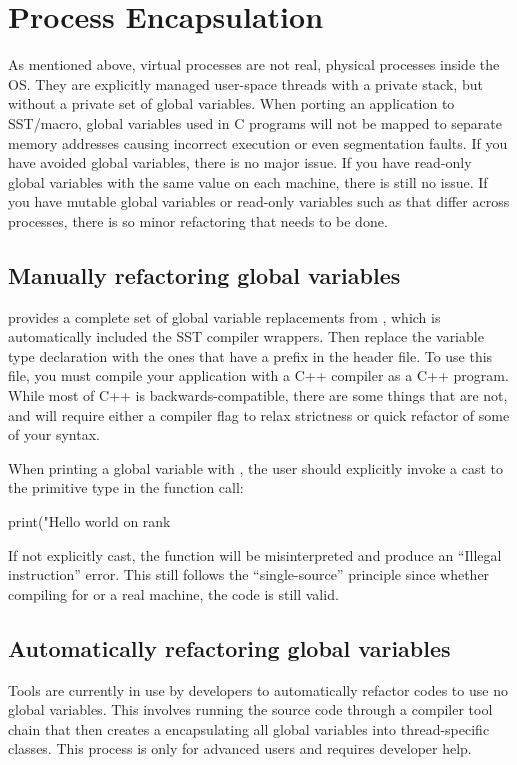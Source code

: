 \section{Process Encapsulation}

As mentioned above, virtual processes are not real, physical processes inside the OS.
They are explicitly managed user-space threads with a private stack, but without a private set of global variables.
When porting an application to SST/macro, global variables used in C programs will not be mapped to separate memory addresses causing incorrect execution or even segmentation faults.
If you have avoided global variables, there is no major issue.  
If you have read-only global variables with the same value on each machine, there is still no issue.
If you have mutable global variables or read-only variables such as  that differ across processes,
there is so minor refactoring that needs to be done.

\subsection{Manually refactoring global variables}
\label{sec:skel:globals}
\sstmacro provides a complete set of global variable replacements from 
, which is automatically included the SST compiler wrappers.
Then replace the variable type declaration with the ones that have a  prefix in the header file.
To use this file, you must compile your application with a C++ compiler as a C++ program.  While most of C++ is backwards-compatible, there are some things that are not, and will require either a compiler flag to relax strictness or quick refactor of some of your syntax.

When printing a global variable with , the user should explicitly invoke a cast to the primitive type in the function call:

\begin{CppCode}
print("Hello world on rank %
\end{CppCode}
If not explicitly cast, the  function will be misinterpreted and produce an ``Illegal instruction'' error.  
This still follows the ``single-source'' principle since whether compiling for \sstmacro or a real machine, the code is still valid.

\subsection{Automatically refactoring global variables}
Tools are currently in use by developers to automatically refactor codes to use no global variables.
This involves running the source code through a compiler tool chain that then creates a 
encapsulating all global variables into thread-specific classes.
This process is only for advanced users and requires developer help.

